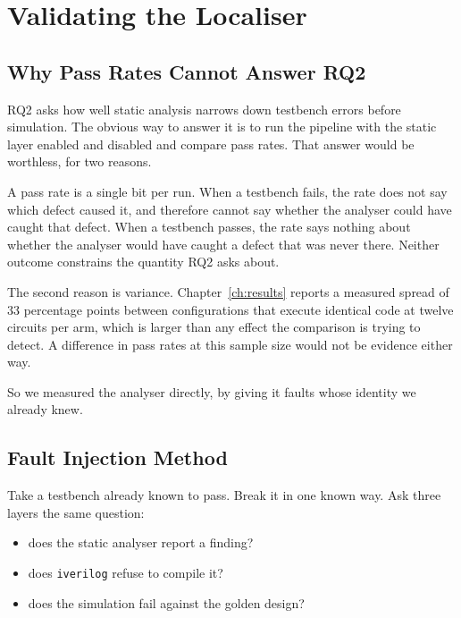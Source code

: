 \documentclass[11pt,a4paper,titlepage=false]{scrreprt}
\begin{document}
\chapter{Validating the Localiser}\label{ch:validation}

\section{Why Pass Rates Cannot Answer RQ2}\label{sec:val-motivation}

RQ2 asks how well static analysis narrows down testbench errors before simulation. The
obvious way to answer it is to run the pipeline with the static layer enabled and disabled
and compare pass rates. That answer would be worthless, for two reasons.

A pass rate is a single bit per run. When a testbench fails, the rate does not say which
defect caused it, and therefore cannot say whether the analyser could have caught that
defect. When a testbench passes, the rate says nothing about whether the analyser would
have caught a defect that was never there. Neither outcome constrains the quantity RQ2 asks
about.

The second reason is variance. Chapter~\ref{ch:results} reports a measured spread of 33
percentage points between configurations that execute identical code at twelve circuits per
arm, which is larger than any effect the comparison is trying to detect. A difference in pass rates at this sample
size would not be evidence either way.

So we measured the analyser directly, by giving it faults whose identity we already knew.

\section{Fault Injection Method}\label{sec:val-method}

Take a testbench already known to pass. Break it in one known way. Ask three layers the
same question:

\begin{itemize}
  \setlength{\itemsep}{0pt}\setlength{\parskip}{0pt}
  \item does the static analyser report a finding?
  \item does \texttt{iverilog} refuse to compile it?
  \item does the simulation fail against the golden design?
\end{itemize}
\end{document}
